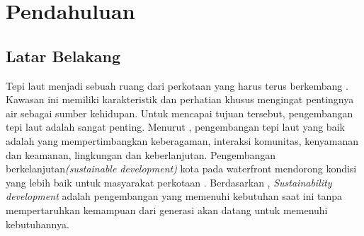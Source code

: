 \documentclass[12pt,oneside]{udthesis}
\makeatletter
\def\maxwidth{ %
  \ifdim\Gin@nat@width>\linewidth
    \linewidth
  \else
    \Gin@nat@width
  \fi
}
\makeatother
\begin{document}









\newcommand{\pieChartFig}
{\begin{figure}[h]
\centering

\texttt{[image: ../figures/stats2-1]} 
\caption{Pie Chart Pekerjaan}
\label{pieChartFig}\end{figure}
}



\newcommand{\tabRegresi}{
\begin{table}[ht]
\centering
\begin{tabular}{lrrrrr}
  \hline
 & Df & Sum Sq & Mean Sq & F value & Pr($>$F) \\ 
  \hline
data2\$total\_fit & 1.000 & 96.998 & 96.998 & 3.679 & 0.065 \\ 
  Residuals & 29.000 & 764.551 & 26.364 &  &  \\ 
   \hline
\end{tabular}
\caption{Regresi Linear} 
\label{tabRegresi}
\end{table}
}



\chapter{Pendahuluan}\label{chap:pendahuluan}

\section{Latar Belakang}
Tepi laut menjadi sebuah ruang dari perkotaan yang harus terus berkembang \cite{shamsuddin2013}. Kawasan ini memiliki karakteristik dan perhatian khusus mengingat pentingnya air sebagai sumber kehidupan. Untuk mencapai tujuan tersebut, pengembangan tepi laut adalah sangat penting. Menurut \cite{hussein2014}, pengembangan tepi laut yang baik adalah yang mempertimbangkan keberagaman, interaksi komunitas, kenyamanan dan keamanan, lingkungan dan keberlanjutan. Pengembangan berkelanjutan\textit{(sustainable development)} kota pada waterfront mendorong kondisi yang lebih baik untuk masyarakat perkotaan \citep{brebbia2016sustainable}.
Berdasarkan \cite{imperatives1987}, \textit{Sustainability development} adalah pengembangan yang memenuhi kebutuhan saat ini tanpa mempertaruhkan kemampuan dari generasi akan datang untuk memenuhi kebutuhannya.
\end{document}
